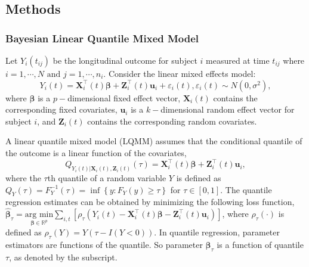 

\subsection{Methods}\label{sec:methods}
\subsubsection{Bayesian Linear Quantile Mixed Model}\label{sec:BLQMM}%

Let $Y_{i}(t_{ij})$ be the longitudinal outcome for subject $i$ measured at time $t_{ij}$ where $i=1, \cdots, N\mbox{ and } j=1,\cdots, n_i$. Consider the linear mixed effects model:
\begin{equation}\label{eqn:lmm}
Y_{i}(t) ={\boldsymbol X}_{i}^{\top}(t) \boldsymbol{\beta}+ {\boldsymbol Z}_{i}^{\top}(t)\boldsymbol{u}_i + \varepsilon_{i}(t), \varepsilon_{i}(t)\sim N(0, \sigma^{2}),
\end{equation}
where $\boldsymbol{\beta}$ is a $p-$dimensional fixed effect vector,  ${\boldsymbol X}_{i}(t)$ contains the corresponding fixed covariates, $\boldsymbol{u}_i$ is a $k-$dimensional random effect vector for subject $i$, and ${\boldsymbol Z}_{i}(t)$ contains the corresponding random covariates.

A linear quantile mixed model (LQMM) assumes that the conditional quantile of the outcome is a linear function of the covariates,
\begin{equation}\label{eqn:lqmm}
Q_{Y_{i}(t)|{\boldsymbol X}_{i}(t),{\boldsymbol Z}_{i}(t)}(\tau)={\boldsymbol X}_{i}^{\top}(t) \boldsymbol{\beta}+ {\boldsymbol Z}_{i}^{\top}(t)\boldsymbol{u}_i,
\end{equation}
where the $\tau$th quantile of a random variable $Y$ is defined as $Q_{Y}(\tau)=F_{Y}^{-1}(\tau)=\inf\left\{ y:F_{Y}(y)\geq\tau\right\}$ for $\tau\in [0, 1]$. The quantile regression estimates can be obtained by minimizing the following loss function, $\hat{\boldsymbol{\beta}}_{\tau}=\underset{\boldsymbol{\beta}\in \mathbb{R}^{p}}{\mbox{arg min}}\sum_{i, t}\left[\rho_{\tau}\left(Y_{i}(t)-{\boldsymbol X}_{i}^{\top}(t)\boldsymbol{\beta} - {\boldsymbol Z}_{i}^{\top}(t)\boldsymbol{u}_i\right)\right]$, where $\rho_{\tau}(\cdot)$ is defined as $\rho_{\tau}(Y)=Y(\tau-{I}{(Y<0)})$. In quantile regression, parameter estimators are functions of the quantile. So parameter $\boldsymbol{\beta}_{\tau}$ is a function of quantile $\tau$, as denoted by the subscript.


